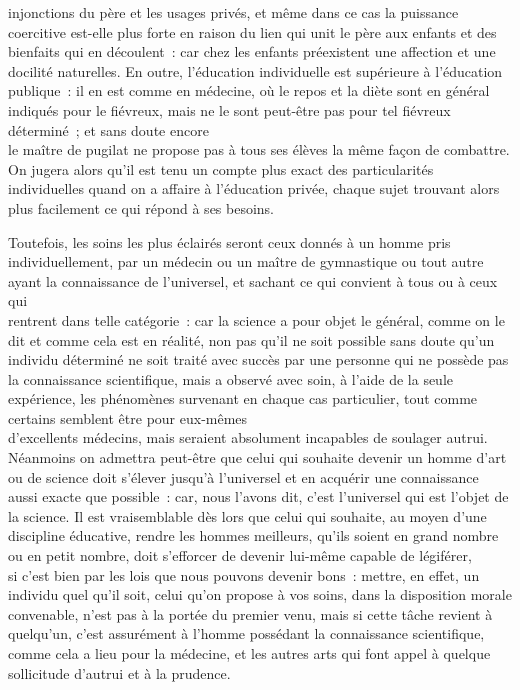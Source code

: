 \documentclass[french,twoside]{book} %
\begin{document}
injonctions du père et les usages privés, et même dans ce cas la puissance coercitive est-elle plus forte en raison du lien qui unit le père aux enfants et des bienfaits qui en découlent : car chez les enfants préexistent une affection et une docilité naturelles. En outre, l’éducation individuelle est supérieure à l’éducation publique : il en est comme en médecine, où le repos et la diète sont en général indiqués pour le fiévreux, mais ne le sont peut-être pas pour tel fiévreux déterminé ; et sans doute encore \\
le maître de pugilat ne propose pas à tous ses élèves la même façon de combattre. On jugera alors qu’il est tenu un compte plus exact des particularités individuelles quand on a affaire à l’éducation privée, chaque sujet trouvant alors plus facilement ce qui répond à ses besoins.\par
Toutefois, les soins les plus éclairés seront ceux donnés à un homme pris individuellement, par un médecin ou un maître de gymnastique ou tout autre ayant la connaissance de l’universel, et sachant ce qui convient à tous ou à ceux qui \\
rentrent dans telle catégorie : car la science a pour objet le général, comme on le dit et comme cela est en réalité, non pas qu’il ne soit possible sans doute qu’un individu déterminé ne soit traité avec succès par une personne qui ne possède pas la connaissance scientifique, mais a observé avec soin, à l’aide de la seule expérience, les phénomènes survenant en chaque cas particulier, tout comme certains semblent être pour eux-mêmes \\
d’excellents médecins, mais seraient absolument incapables de soulager autrui. Néanmoins on admettra peut-être que celui qui souhaite devenir un homme d’art ou de science doit s’élever jusqu’à l’universel et en acquérir une connaissance aussi exacte que possible : car, nous l’avons dit, c’est l’universel qui est l’objet de la science. Il est vraisemblable dès lors que celui qui souhaite, au moyen d’une discipline éducative, rendre les hommes meilleurs, qu’ils soient en grand nombre ou en petit nombre, doit s’efforcer de devenir lui-même capable de légiférer, \\
si c’est bien par les lois que nous pouvons devenir bons : mettre, en effet, un individu quel qu’il soit, celui qu’on propose à vos soins, dans la disposition morale convenable, n’est pas à la portée du premier venu, mais si cette tâche revient à quelqu’un, c’est assurément à l’homme possédant la connaissance scientifique, comme cela a lieu pour la médecine, et les autres arts qui font appel à quelque sollicitude d’autrui et à la prudence.\par
\end{document}
